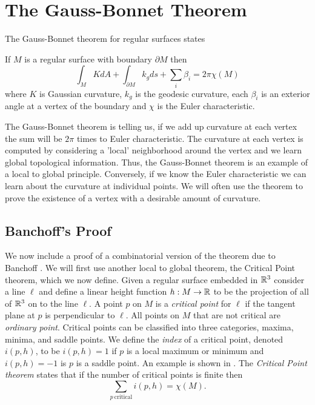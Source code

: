 \section{The Gauss-Bonnet Theorem}



The Gauss-Bonnet theorem for regular surfaces states

\begin{theorem} \label{thm:g-b-c}

If $M$ is a regular surface with boundary $\partial M$ then
	$$\int_{M} K dA+ \int_{\partial M} k_g ds + \sum_i \beta_i= 2\pi \chi(M)$$
	where  $K$ is Gaussian curvature,
	 $k_g$ is the geodesic curvature,
	 each $\beta_i$  is an exterior angle at a vertex of the boundary and
	$\chi$ is the Euler characteristic.
\end{theorem}


The  Gauss-Bonnet theorem is  telling us, if we add up curvature
at each vertex the sum will be $2\pi$ times to Euler characteristic.
The curvature at each vertex is computed by considering a 'local' neighborhood
around the vertex and we learn global topological information. Thus, the Gauss-Bonnet 
theorem is an example of a local to global principle. 
Conversely, if we know the Euler characteristic we can learn about the curvature
at individual points. We will often use the theorem to prove the existence of
a vertex with a desirable amount of curvature.



\subsection{Banchoff's Proof}
We now include a proof of a combinatorial version of the theorem due to Banchoff
\cite{banchoff_critical_1970}. We will first use another local to global theorem,
the Critical Point theorem, which we now define.
Given a regular surface embedded in $\mathbb{R}^3$ consider a line $\ell$ and define a linear height function $h:M \to \mathbb{R}$
to be the projection of all of $\mathbb{R}^3$ on to the line $\ell$. A point $p$ on $M$
is a \emph{critical point} for $\ell$ if the tangent plane at $p$ is perpendicular to $\ell$.
All points on $M$ that are not critical are \emph{ordinary point}.
Critical points can be classified into three categories, maxima, minima, and saddle points.
We define the \emph{index} of a critical point, denoted $i(p,h)$, to be 
$i(p,h)=1$ if $p$ is a  local maximum or minimum and $i(p,h)=-1$ is $p$ is a saddle point.
An example is shown in .
The \emph{Critical  Point theorem} states that if the number of critical points is finite
then 
\begin{equation} \label{eqn:critical-point-theorem}
	\sum_{p\ \textrm{critical}} i(p,h)=\chi(M).
\end{equation}


